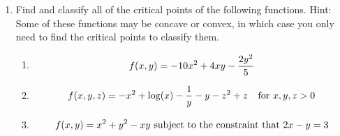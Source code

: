 \documentclass[11pt]{article}
\begin{document}
\begin{enumerate}
\begin{enumerate}
\end{enumerate}

\vspace{.2in}

\item Find and classify all of the critical points of the following functions.  Hint: Some of these functions may be concave or convex, in which case you only need to find the critical points to classify them.

\begin{enumerate}

\item  $$f(x, y)=-10x^2+4xy-{{2y^2}\over 5}$$


\item $$f(x, y, z)=-x^2+{\log}(x)-{1\over y}-y-z^2+z \hspace{.1in}\hbox{ for }x, y, z>0$$


\item $$f(x, y)=x^2+y^2-xy \hbox{ subject to the constraint that }2x-y=3$$

\end{enumerate}

\end{enumerate}
\end{document}
